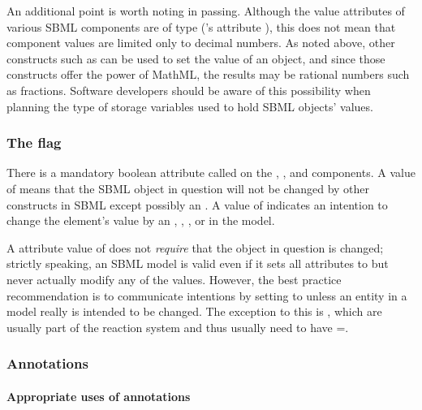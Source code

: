 An additional point is worth noting in passing.  Although the
value attributes of various SBML components are of type
 (\eg \Parameter's attribute ), this
does not mean that component values are limited only to decimal
numbers.  As noted above, other constructs such as
\InitialAssignment can be used to set the value of an object, and
since those constructs offer the power of MathML, the results may
be rational numbers such as fractions.  Software developers should
be aware of this possibility when planning the type of storage
variables used to hold SBML objects' values.


\subsubsection{The  flag}
\label{sec:bp:constant}

There is a mandatory boolean attribute called  on
the \Compartment, \Species, \SpeciesReference and
\Parameter components.  A value of  means that the SBML
object in question will not be changed by other constructs in SBML
except possibly an \InitialAssignment.  A value of 
indicates an intention to change the element's value by an
\AssignmentRule, \RateRule, \AlgebraicRule, \Reaction or \Event in
the model.

A  attribute value of  does not
\emph{require} that the object in question is changed; strictly
speaking, an SBML model is valid even if it sets all
 attributes to  but never actually
modify any of the values.  However, the best practice
recommendation is to communicate intentions by setting
 to  unless an entity in a model really
is intended to be changed.  The exception to this is \Species,
which are usually part of the reaction system and thus usually
need to have =.


\subsubsection{Annotations}
\label{sec:bp:annotations}

\paragraph{Appropriate uses of annotations}

